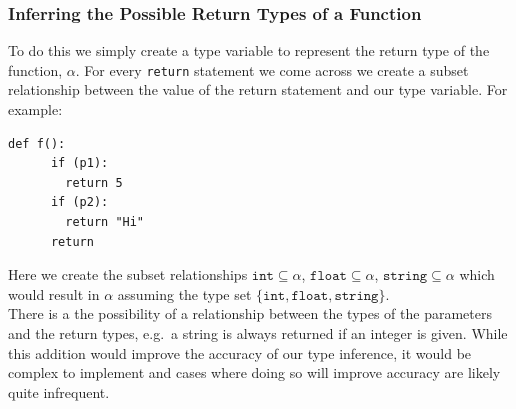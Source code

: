 \documentclass[12pt, titlepage]{article}
\begin{document}
\subsubsection{Inferring the Possible Return Types of a Function}
To do this we simply create a type variable to represent the return type of the function, $\alpha$. For every \texttt{return} statement we come across we create a subset relationship between the value of the return statement and our type variable. For example:
\begin{lstlisting}[mathescape]
    def f():
      if (p1):
        return 5
      if (p2):
        return "Hi"
      return
\end{lstlisting}
Here we create the subset relationships $\texttt{int} \subseteq \alpha$, $\texttt{float} \subseteq \alpha$, $\texttt{string} \subseteq \alpha$ which would result in $\alpha$ assuming the type set $\{\texttt{int}, \texttt{float}, \texttt{string}\}$. \\
\indent There is a the possibility of a relationship between the types of the parameters and the return types, e.g.\ a string is always returned if an integer is given. While this addition would improve the accuracy of our type inference, it would be complex to implement and cases where doing so will improve accuracy are likely quite infrequent.
\end{document}
